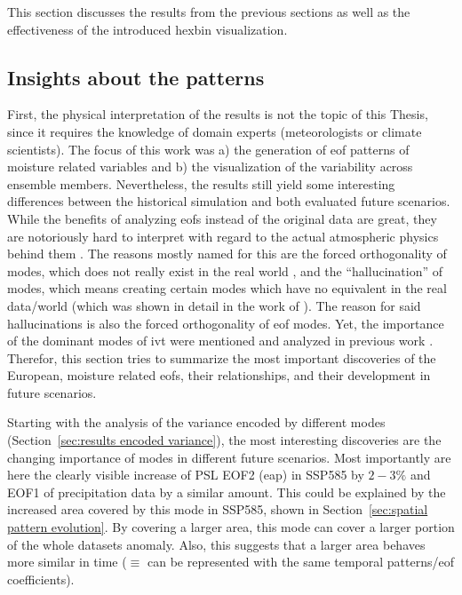 This section discusses the results from the previous sections as well as the effectiveness of the introduced hexbin visualization. 

\subsection{Insights about the patterns}


First, the physical interpretation of the results is not the topic of this Thesis, since it requires the knowledge of domain experts (meteorologists or climate scientists). 
The focus of this work was a) the generation of \ac{eof} patterns of moisture related variables and b) the visualization of the variability across ensemble members. 
Nevertheless, the results still yield some interesting differences between the historical simulation and both evaluated future scenarios. 
While the benefits of analyzing \acp{eof} instead of the original data are great, they are notoriously hard to interpret with regard to the actual atmospheric physics behind them \cite{dommenget_cautionary_2002, hannachi_empirical_2007}.
The reasons mostly named for this are the forced orthogonality of modes, which does not really exist in the real world \cite{hannachi_empirical_2007}, and the \enquote{hallucination} of modes, which means creating certain modes which have no equivalent in the real data/world (which was shown in detail in the work of ). 
The reason for said hallucinations is also the forced orthogonality of \ac{eof} modes. 
Yet, the importance of the dominant modes of \ac{ivt} were mentioned and analyzed in previous work \cite{salstein_modes_1983, zou_interdecadal_2018}. 
Therefor, this section tries to summarize the most important discoveries of the European, moisture related \acp{eof}, their relationships, and their development in future scenarios. 

Starting with the analysis of the variance encoded by different modes (Section~\ref{sec:results encoded variance}), the most interesting discoveries are the changing importance of modes in different future scenarios. 
Most importantly are here the clearly visible increase of PSL EOF2 (\ac{eap}) in SSP585 by $2-3 \%$ and EOF1 of precipitation data by a similar amount. 
This could be explained by the increased area covered by this mode in SSP585, shown in Section~\ref{sec:spatial pattern evolution}. 
By covering a larger area, this mode can cover a larger portion of the whole datasets anomaly. 
Also, this suggests that a larger area behaves more similar in time ($\equiv$ can be represented with the same temporal patterns/\ac{eof} coefficients). 


